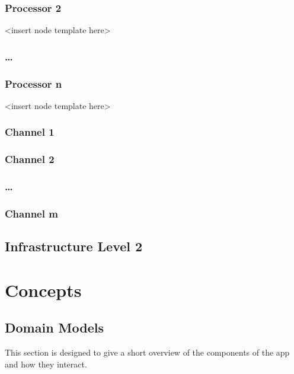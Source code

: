 \documentclass[]{article}
\begin{document}
\subsubsection{Processor 2}

\textless{}insert node template here\textgreater{}

\subsubsection{\ldots{}}

\subsubsection{Processor n}

\textless{}insert node template here\textgreater{}

\subsubsection{Channel 1}

\subsubsection{Channel 2}

\subsubsection{\ldots{}}

\subsubsection{Channel m}

\subsection{Infrastructure Level 2}

\section{Concepts}

\subsection{Domain Models}

This section is designed to give a short overview of the components of the app and how they interact.
\end{document}
